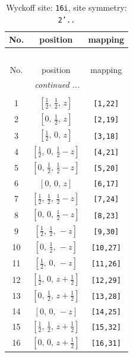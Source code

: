 \documentclass[fleqn,8pt]{jsarticle}
\begin{document}
\begin{longtable}{ccc}
\caption{Wyckoff site: {\tt 16i}, site symmetry: {\tt 2'..}}
 \\
 \hline \hline
No. & position & mapping \\ \hline \endfirsthead

\multicolumn{2}{l}{\tablename\ \thetable{}} \\
 \hline \hline
No. & position & mapping \\ \hline \endhead

 \hline \hline
\multicolumn{2}{r}{\footnotesize\it continued ...} \\ \endfoot

 \hline \hline
\multicolumn{2}{r}{} \\ \endlastfoot

1 & $\left[ \frac{1}{2},\, \frac{1}{2},\, z \right]$ & {\tt [1,22]} \\ \hline
2 & $\left[ 0,\, \frac{1}{2},\, z \right]$ & {\tt [2,19]} \\ \hline
3 & $\left[ \frac{1}{2},\, 0,\, z \right]$ & {\tt [3,18]} \\ \hline
4 & $\left[ \frac{1}{2},\, 0,\, \frac{1}{2} - z \right]$ & {\tt [4,21]} \\ \hline
5 & $\left[ 0,\, \frac{1}{2},\, \frac{1}{2} - z \right]$ & {\tt [5,20]} \\ \hline
6 & $\left[ 0,\, 0,\, z \right]$ & {\tt [6,17]} \\ \hline
7 & $\left[ \frac{1}{2},\, \frac{1}{2},\, \frac{1}{2} - z \right]$ & {\tt [7,24]} \\ \hline
8 & $\left[ 0,\, 0,\, \frac{1}{2} - z \right]$ & {\tt [8,23]} \\ \hline
9 & $\left[ \frac{1}{2},\, \frac{1}{2},\, - z \right]$ & {\tt [9,30]} \\ \hline
10 & $\left[ 0,\, \frac{1}{2},\, - z \right]$ & {\tt [10,27]} \\ \hline
11 & $\left[ \frac{1}{2},\, 0,\, - z \right]$ & {\tt [11,26]} \\ \hline
12 & $\left[ \frac{1}{2},\, 0,\, z + \frac{1}{2} \right]$ & {\tt [12,29]} \\ \hline
13 & $\left[ 0,\, \frac{1}{2},\, z + \frac{1}{2} \right]$ & {\tt [13,28]} \\ \hline
14 & $\left[ 0,\, 0,\, - z \right]$ & {\tt [14,25]} \\ \hline
15 & $\left[ \frac{1}{2},\, \frac{1}{2},\, z + \frac{1}{2} \right]$ & {\tt [15,32]} \\ \hline
16 & $\left[ 0,\, 0,\, z + \frac{1}{2} \right]$ & {\tt [16,31]} \\
\end{longtable}
\end{document}
